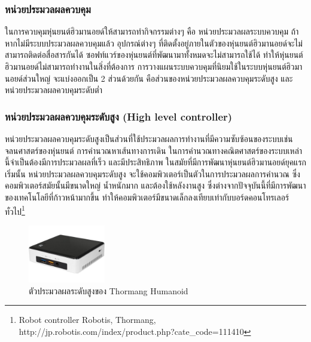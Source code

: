 \clearpage
\subsubsection*{หน่วยประมวลผลควบคุม}
ในการควบคุมหุ่นยนต์ฮิวมานอยด์ให้สามารถทำกิจกรรมต่างๆ คือ
หน่วยประมวลผลระบบควบคุม ถ้าหากไม่มีระบบประมวลผลควบคุมแล้ว อุปกรณ์ต่างๆ ที่ติดตั้งอยู่ภายในตัวของหุ่นยนต์ฮิวมานอยด์จะไม่สามารถติดต่อสื่อสารกันได้
ซอฟท์แวร์ของหุ่นยนต์ที่พัฒนามาทั้งหมดจะไม่สามารถใช้ได้ ทำให้หุ่นยนต์ฮิวมานอยด์ไม่สามารถทำงานในสิ่งที่ต้องการ
การวางแผนระบบควบคุมที่นิยมใช้ในระบบหุ่นยนต์ฮิวมานอยด์ส่วนใหญ่ จะแบ่งออกเป็น 2 ส่วนด้วยกัน 
คือส่วนของหน่วยประมวลผลควบคุมระดับสูง และหน่วยประมวลผลควบคุมระดับต่ำ

\subsubsection*{หน่วยประมวลผลควบคุมระดับสูง (High level controller)}
หน่วยประมวลผลควบคุมระดับสูงเป็นส่วนที่ใช้ประมวลผลการทำงานที่มีความซับซ้อนของระบบเช่น
จลนศาสตร์ของหุ่นยนต์ การคำนวณหาเส้นทางการเดิน ในการคำนวณทางคณิตศาสตร์ของระบบเหล่านี้จำเป็นต้องมีการประมวลผลที่เร็ว
และมีประสิทธิภาพ ในสมัยที่มีการพัฒนาหุ่นยนต์ฮิวมานอยด์ยุคแรกเริ่มนั้น หน่วยประมวลผลควบคุมระดับสูง
จะใช้คอมพิวเตอร์เป็นตัวในการประมวลผลการคำนวณ ซึ่งคอมพิวเตอร์สมัยนั้นมีขนาดใหญ่ น้ำหนักมาก
และต้องใช้หลังงานสูง ซึ่งต่างจากปัจจุบันนี้ที่มีการพัฒนาของเทคโนโลยีที่ก้าวหน้ามากขึ้น
ทำให้คอมพิวเตอร์มีขนาดเล็กลงเทียบเท่ากับบอร์ดคอนโทรเลอร์ทั่วไป\footnote{Robot controller Robotis, Thormang, http://jp.robotis.com/index/product.php?cate\_code=111410}

\begin{figure}[!ht]
    \centering
    \includegraphics[width=0.3\textwidth]{chapter2/images/thormang_controller.jpg}
    \caption{ตัวประมวลผลระดับสูงของ Thormang Humanoid}
    \label{fig:thormang_controller}
\end{figure}

